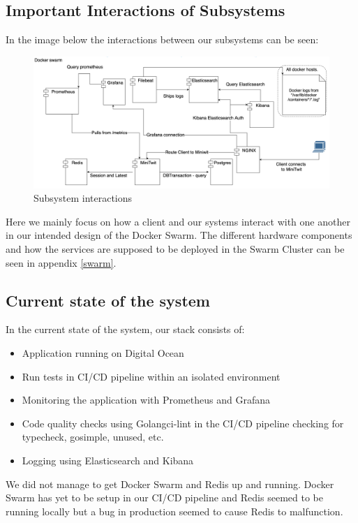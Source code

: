 \subsection{Important Interactions of Subsystems}
In the image below the interactions between our subsystems can be seen:

\begin{figure}[H]
    \centering
    \captionsetup{justification=centering,margin=1cm}
    \includegraphics[width=\linewidth]{report/images/InteractionsOfSystems.png}
    \caption{Subsystem interactions}
    \label{fig:minitwit}
\end{figure}

Here we mainly focus on how a client and our systems interact with one another in our intended design of the Docker Swarm. The different hardware components and how the services are supposed to be deployed in the Swarm Cluster can be seen in appendix \ref{swarm}.

\subsection{Current state of the system}
In the current state of the system, our stack consists of: 
\begin{itemize}
    \item Application running on Digital Ocean
    \item Run tests in CI/CD pipeline within an isolated environment
    \item Monitoring the application with Prometheus and Grafana
    \item Code quality checks using Golangci-lint in the CI/CD pipeline checking for typecheck, gosimple, unused, etc.
    \item Logging using Elasticsearch and Kibana
\end{itemize}
We did not manage to get Docker Swarm and Redis up and running. Docker Swarm has yet to be setup in our CI/CD pipeline and Redis seemed to be running locally but a bug in production seemed to cause Redis to malfunction.

